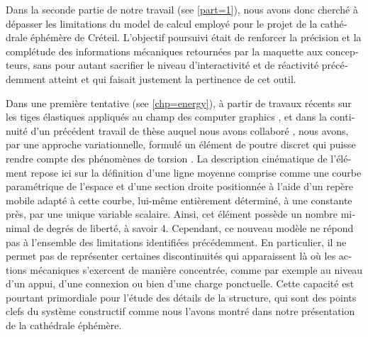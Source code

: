 \begin{otherlanguage}{french}
Dans la seconde partie de notre travail (see \cref{part=1}), nous avons donc cherché à dépasser les limitations du model de calcul employé pour le projet de la cathédrale éphémère de Créteil. L'objectif poursuivi était de renforcer la précision et la complétude des informations mécaniques retournées par la maquette aux concepteurs, sans pour autant sacrifier le niveau d'interactivité et de réactivité précédemment atteint et qui faisait justement la pertinence de cet outil.

Dans une première tentative (see \cref{chp=energy}), à partir de travaux récents sur les tiges élastiques appliqués au champ des computer graphics \cite{Bergou2008}, et dans la continuité d'un précédent travail de thèse auquel nous avons collaboré \cite{Tayeb2015a}, nous avons, par une approche variationnelle, formulé un élément de poutre discret qui puisse rendre compte des phénomènes de torsion \cite{Lefevre2017}. La description cinématique de l'élément repose ici sur la définition d'une ligne moyenne comprise comme une courbe paramétrique de l'espace et d'une section droite positionnée à l'aide d'un repère mobile adapté à cette courbe, lui-même entièrement déterminé, à une constante près, par une unique variable scalaire. Ainsi, cet élément possède un nombre minimal de degrés de liberté, à savoir 4. Cependant, ce nouveau modèle ne répond pas à l'ensemble des limitations identifiées précédemment. En particulier, il ne permet pas de représenter certaines discontinuités qui apparaissent là où les actions mécaniques s'exercent de manière concentrée, comme par exemple au niveau d'un appui, d'une connexion ou bien d'une charge ponctuelle. Cette capacité est pourtant primordiale pour l'étude des détails de la structure, qui sont des points clefs du système constructif comme nous l'avons montré dans notre présentation de la cathédrale éphémère.


\end{otherlanguage}
